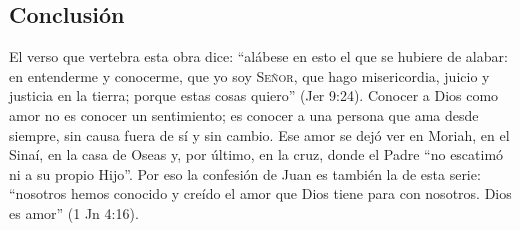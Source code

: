 \documentclass[11pt,letterpaper]{article}
\newcommand{\SENOR}{\textsc{Señor}}
\begin{document}
\subsection{Conclusión}
El verso que vertebra esta obra dice: ``alábese en esto el que se hubiere de alabar: en entenderme y conocerme, que yo soy \SENOR, que hago misericordia, juicio y justicia en la tierra; porque estas cosas quiero'' (Jer 9:24). Conocer a Dios como amor no es conocer un sentimiento; es conocer a una persona que ama desde siempre, sin causa fuera de sí y sin cambio. Ese amor se dejó ver en Moriah, en el Sinaí, en la casa de Oseas y, por último, en la cruz, donde el Padre ``no escatimó ni a su propio Hijo''. Por eso la confesión de Juan es también la de esta serie: ``nosotros hemos conocido y creído el amor que Dios tiene para con nosotros. Dios es amor'' (1 Jn 4:16).

\end{document}
